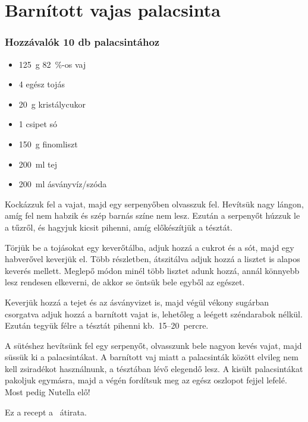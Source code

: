 \newpage
\section*{Barnított vajas palacsinta} \label{sec:barnitott-vajas-palacsinta}

\subsubsection*{Hozzávalók 10 db palacsintához}
\begin{itemize}
    \item \qty{125}{\g} \qty{82}{\percent}-os vaj
    \item \num{4} egész tojás
    \item \qty{20}{\g} kristálycukor
    \item \num{1} csipet só
    \item \qty{150}{\g} finomliszt
    \item \qty{200}{\ml} tej
    \item \qty{200}{\ml} ásványvíz/szóda
\end{itemize}

Kockázzuk fel a vajat, majd egy serpenyőben olvasszuk fel. Hevítsük nagy lángon, amíg fel nem habzik és szép barnás színe nem lesz. Ezután a serpenyőt húzzuk le a tűzről, és hagyjuk kicsit pihenni, amíg előkészítjük a tésztát.

Törjük be a tojásokat egy keverőtálba, adjuk hozzá a cukrot és a sót, majd egy habverővel keverjük el. Több részletben, átszitálva adjuk hozzá a lisztet is alapos keverés mellett. Meglepő módon minél több lisztet adunk hozzá, annál könnyebb lesz rendesen elkeverni, de akkor se öntsük bele egyből az egészet.

Keverjük hozzá a tejet és az ásványvizet is, majd végül vékony sugárban csorgatva adjuk hozzá a barnított vajat is, lehetőleg a leégett széndarabok nélkül. Ezután tegyük félre a tésztát pihenni kb.~\numrange{15}{20}~percre.

A sütéshez hevítsünk fel egy serpenyőt, olvasszunk bele nagyon kevés vajat, majd süssük ki a palacsintákat. A barnított vaj miatt a palacsinták között elvileg nem kell zsiradékot használnunk, a tésztában lévő elegendő lesz. A kisült palacsintákat pakoljuk egymásra, majd a végén fordítsuk meg az egész oszlopot fejjel lefelé. Most pedig Nutella elő!

Ez a recept a~\cite{szell_palacsinta} átirata.
